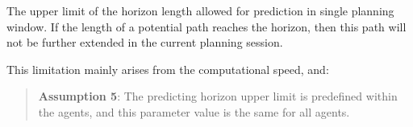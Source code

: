 \begin{itemize}
    The upper limit of the horizon length allowed for prediction in single planning window.
    If the length of a potential path reaches the horizon, then this path will not be further extended in the current planning session.
    
    This limitation mainly arises from the computational speed, and:
    \begin{quotation}
        \textbf{Assumption 5}: 
        The predicting horizon upper limit is predefined within the agents, and this parameter value is the same for all agents.
    \end{quotation}

\end{itemize}